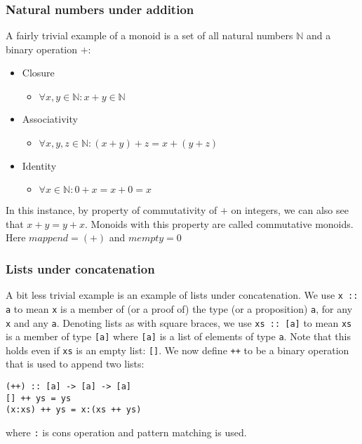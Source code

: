 \documentclass{acm_proc_article-sp}
\begin{document}
\subsubsection{Natural numbers under addition}
A fairly trivial example of a monoid is a set of all natural numbers
$\mathbb{N}$ and a binary operation $+$:
\begin{itemize}
\item Closure
  \begin{itemize}
  \item $\forall x,y \in \mathbb{N} : x + y \in \mathbb{N}$
  \end{itemize}
\item Associativity
  \begin{itemize}
  \item $\forall x,y,z \in \mathbb{N} : (x + y) + z = x + (y + z)$
  \end{itemize}
\item Identity
  \begin{itemize}
  \item $\forall x \in \mathbb{N} : 0 + x = x + 0 = x$
  \end{itemize}
\end{itemize}
In this instance, by property of commutativity of $+$ on integers, we
can also see that $x + y = y + x$. Monoids with this property are
called commutative monoids. Here $mappend = (+)$ and $mempty = 0$

\subsubsection{Lists under concatenation}
A bit less trivial example is an example of lists under concatenation.
We use \texttt{x :: a} to mean \texttt{x} is a
member of (or a proof of) the type (or a proposition) \texttt{a}, for any \texttt{x} and any
\texttt{a}. Denoting lists as with square
braces, we use \texttt{xs :: [a]} to mean \texttt{xs} is a member of type
\texttt{[a]} where \texttt{[a]} is a list of elements of type \texttt{a}. Note that this
holds even if \texttt{xs} is an empty list: \texttt{[]}. We now define \texttt{++} to be a
binary operation that is used to append two lists:
\begin{lstlisting}
(++) :: [a] -> [a] -> [a]
[] ++ ys = ys
(x:xs) ++ ys = x:(xs ++ ys)
\end{lstlisting}
where \texttt{:} is cons operation and pattern matching is used.
\end{document}
